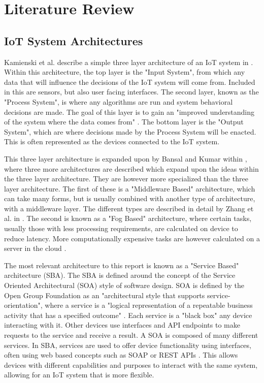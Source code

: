 \chapter{Literature Review} \label{cha:chapter2}

\section{IoT System Architectures} \label{sec:chap2:architectures}
Kamienski et al. describe a simple three layer architecture of an IoT system in \cite{DesigningOpenIotSystem}. Within this architecture, the top layer is the "Input System", from which any data that will influence the decisions of the IoT system will come from. Included in this are sensors, but also user facing interfaces. The second layer, known as the "Process System", is where any algorithms are run and system behavioral decisions are made. The goal of this layer is to gain an "improved understanding of the system where the  data comes from" \cite{DesigningOpenIotSystem}. The bottom layer is the "Output System", which are where decisions made by the Process System will be enacted. This is often represented as the devices connected to the IoT system.

This three layer architecture is expanded upon by Bansal and Kumar within \cite{IotEcosystemSurvey}, where three more architectures are described which expand upon the ideas within the three layer architecture. They are however more specialized than the three layer architecture. The first of these is a "Middleware Based" architecture, which can take many forms, but is usually combined with another type of architecture, with a middleware layer. The different types are described in detail by Zhang et al. in \cite{MiddlewareIOTSurvey}. The second is known as a "Fog Based" architecture, where certain tasks, usually those with less processing requirements, are calculated on device to reduce latency. More computationally expensive tasks are however calculated on a server in the cloud \cite{IoTArchitectures}.

The most relevant architecture to this report is known as a "Service Based" architecture (SBA). The SBA is defined around the concept of the Service Oriented Architectural (SOA) style \cite{InteractingSoaBasedIot} of software design. SOA is defined by the Open Group Foundation as an "architectural style that supports service-orientation", where a service is a "logical representation of a repeatable business activity that has a specified outcome" \cite{SoaSourceBook}. Each service is a "black box" any device interacting with it. Other devices use interfaces and API endpoints to make requests to the service and receive a result. A SOA is composed of many different services. In SBA, services are used to offer device functionality using interfaces, often using web based concepts such as SOAP or REST APIs \cite{TrustManagementSoaIot}. This allows devices with different capabilities and purposes to interact with the same system, allowing for an IoT system that is more flexible. 


